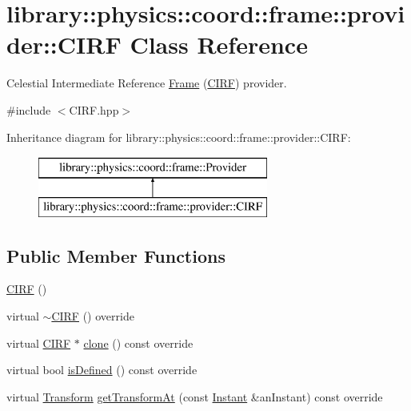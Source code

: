 \hypertarget{classlibrary_1_1physics_1_1coord_1_1frame_1_1provider_1_1_c_i_r_f}{}\section{library\+:\+:physics\+:\+:coord\+:\+:frame\+:\+:provider\+:\+:C\+I\+RF Class Reference}
\label{classlibrary_1_1physics_1_1coord_1_1frame_1_1provider_1_1_c_i_r_f}


Celestial Intermediate Reference \hyperlink{classlibrary_1_1physics_1_1coord_1_1_frame}{Frame} (\hyperlink{classlibrary_1_1physics_1_1coord_1_1frame_1_1provider_1_1_c_i_r_f}{C\+I\+RF}) provider.  




{\ttfamily \#include $<$C\+I\+R\+F.\+hpp$>$}

Inheritance diagram for library\+:\+:physics\+:\+:coord\+:\+:frame\+:\+:provider\+:\+:C\+I\+RF\+:\begin{figure}[H]
\begin{center}
\leavevmode
\includegraphics[height=2.000000cm]{classlibrary_1_1physics_1_1coord_1_1frame_1_1provider_1_1_c_i_r_f}
\end{center}
\end{figure}
\subsection*{Public Member Functions}
\begin{DoxyCompactItemize}
\item 
\hyperlink{classlibrary_1_1physics_1_1coord_1_1frame_1_1provider_1_1_c_i_r_f_a69759da2122df1ba03dc52f708b1cc8b}{C\+I\+RF} ()
\item 
virtual \hyperlink{classlibrary_1_1physics_1_1coord_1_1frame_1_1provider_1_1_c_i_r_f_aded0757cb9c4deab34318e65f74f05b8}{$\sim$\+C\+I\+RF} () override
\item 
virtual \hyperlink{classlibrary_1_1physics_1_1coord_1_1frame_1_1provider_1_1_c_i_r_f}{C\+I\+RF} $\ast$ \hyperlink{classlibrary_1_1physics_1_1coord_1_1frame_1_1provider_1_1_c_i_r_f_af75424e9e3a86a5aa06f998a8710c5c2}{clone} () const override
\item 
virtual bool \hyperlink{classlibrary_1_1physics_1_1coord_1_1frame_1_1provider_1_1_c_i_r_f_ab5676de1c31ad796d56a684615fabdf8}{is\+Defined} () const override
\item 
virtual \hyperlink{classlibrary_1_1physics_1_1coord_1_1_transform}{Transform} \hyperlink{classlibrary_1_1physics_1_1coord_1_1frame_1_1provider_1_1_c_i_r_f_afa16d0f890856396364443239ceac509}{get\+Transform\+At} (const \hyperlink{classlibrary_1_1physics_1_1time_1_1_instant}{Instant} \&an\+Instant) const override
\end{DoxyCompactItemize}


